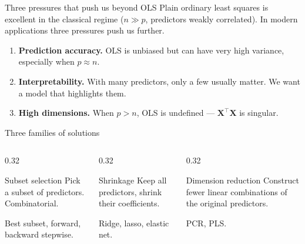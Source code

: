 \documentclass[aspectratio=169,11pt]{beamer}
\begin{document}
\begin{frame}{Three pressures that push us beyond OLS}
  Plain ordinary least squares is excellent in the classical regime
  ($n \gg p$, predictors weakly correlated). In modern applications
  three pressures push us further.
  \begin{takeaway}
    \begin{enumerate}
      \item \textbf{Prediction accuracy.} OLS is unbiased but can have
            very high variance, especially when $p \approx n$.
      \item \textbf{Interpretability.} With many predictors, only a
            few usually matter. We want a model that highlights them.
      \item \textbf{High dimensions.} When $p > n$, OLS is undefined
            --- $\mathbf{X}^\top\mathbf{X}$ is singular.
    \end{enumerate}
  \end{takeaway}
\end{frame}

\begin{frame}{Three families of solutions}
  \begin{columns}[T]
    \begin{column}{0.32\textwidth}
      \begin{block}{Subset selection}
        Pick a subset of predictors. Combinatorial.
      \end{block}
      Best subset, forward, backward stepwise.
    \end{column}
    \begin{column}{0.32\textwidth}
      \begin{block}{Shrinkage}
        Keep all predictors, shrink their coefficients.
      \end{block}
      Ridge, lasso, elastic net.
    \end{column}
    \begin{column}{0.32\textwidth}
      \begin{block}{Dimension reduction}
        Construct fewer linear combinations of the original
        predictors.
      \end{block}
      PCR, PLS.
    \end{column}
  \end{columns}
\end{frame}
\end{document}
